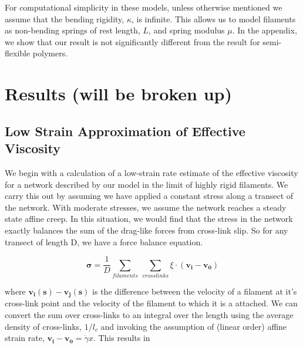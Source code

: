 \documentclass[pre,preprint]{revtex4-1}
\begin{document}
For computational simplicity in these models, unless otherwise mentioned we assume that the bending rigidity, $\kappa$, is infinite. This allows us to model filaments as non-bending springs of rest length, $L$, and spring modulus $\mu$.  In the appendix, we show that our result is not significantly different from the result for semi-flexible polymers.































\section{Results (will be broken up)}

\subsection{Low Strain Approximation of Effective Viscosity}
We begin with a calculation of a low-strain rate estimate of the effective viscosity for a network described by our model in the limit of highly rigid filaments.  We carry this out by assuming we have applied a constant stress along a transect of the network.  With moderate stresses, we assume the network reaches a steady state affine creep. In this situation, we would find that the stress in the network exactly balances the sum of the drag-like forces from cross-link slip.  So for any transect of length D, we have a force balance equation.

\begin{equation}
\mathbf{\sigma} = \frac{1}{D}\sum_{filaments}\: \sum_{crosslinks}\xi \cdot (\mathbf{v_i}-\mathbf{v_0})
\end{equation}

where $\mathbf{v_i(s)}-\mathbf{v_j(s)}$ is the difference between the velocity of a filament at it's cross-link point and the velocity of the filament to which it is a attached. We can convert the sum over cross-links to an integral over the length using the average density of cross-links, $1/l_c$ and invoking the assumption of (linear order) affine strain rate, $\mathbf{v_i}-\mathbf{v_0}=\dot \gamma x$. This results in
\end{document}
